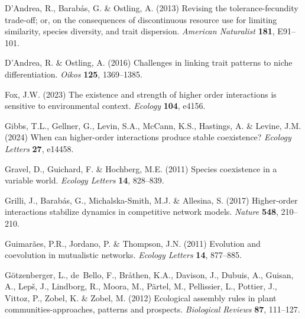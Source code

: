 \documentclass[11pt]{article}
\begin{document}
\begin{thebibliography}{51}
D'Andrea, R., Barab\'as, G. \& Ostling, A. (2013) Revising the
  tolerance-fecundity trade-off; or, on the consequences of discontinuous
  resource use for limiting similarity, species diversity, and trait
  dispersion. \emph{American Naturalist} \textbf{181}, E91--101.

D'Andrea, R. \& Ostling, A. (2016) Challenges in linking trait patterns to
  niche differentiation. \emph{Oikos} \textbf{125}, 1369--1385.

Fox, J.W. (2023) The existence and strength of higher order interactions is
  sensitive to environmental context. \emph{Ecology} \textbf{104}, e4156.

Gibbs, T.L., Gellner, G., Levin, S.A., McCann, K.S., Hastings, A. \& Levine,
  J.M. (2024) When can higher-order interactions produce stable coexistence?
  \emph{Ecology Letters} \textbf{27}, e14458.

Gravel, D., Guichard, F. \& Hochberg, M.E. (2011) Species coexistence in a
  variable world. \emph{Ecology Letters} \textbf{14}, 828--839.

Grilli, J., Barabás, G., Michalska-Smith, M.J. \& Allesina, S. (2017)
  Higher-order interactions stabilize dynamics in competitive network models.
  \emph{Nature} \textbf{548}, 210--210.

Guimarães, P.R., Jordano, P. \& Thompson, J.N. (2011) Evolution and
  coevolution in mutualistic networks. \emph{Ecology Letters} \textbf{14},
  877--885.

Götzenberger, L., de~Bello, F., Bråthen, K.A., Davison, J., Dubuis, A.,
  Guisan, A., Lepš, J., Lindborg, R., Moora, M., Pärtel, M., Pellissier, L.,
  Pottier, J., Vittoz, P., Zobel, K. \& Zobel, M. (2012) Ecological assembly
  rules in plant communities-approaches, patterns and prospects.
  \emph{Biological Reviews} \textbf{87}, 111--127.


\end{thebibliography}
\end{document}
